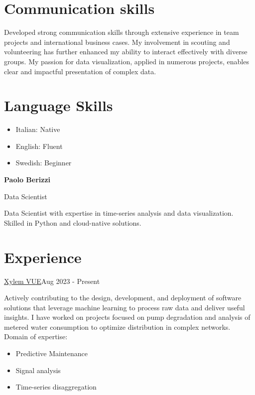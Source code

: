 \documentclass[hipsterpaolo]{simplehipstercv}
\begin{document}
\begin{paracol}{2}
{\section*{Communication skills}
Developed strong communication skills through extensive experience in team
projects and international business cases.
My involvement in scouting and volunteering has further enhanced my
ability to interact effectively with diverse groups. My passion for data visualization,
applied in numerous projects, enables clear and impactful presentation of complex data.

\section*{Language Skills}
\begin{itemize}[leftmargin=*]
    \item Italian: Native
    \item English: Fluent
    \item Swedish: Beginner
\end{itemize}

\phantom{turn the page}

\phantom{turn the page}

}
\switchcolumn
{\huge \color{myblue}\textbf{Paolo Berizzi}}

\bigskip

{\large Data Scientist}

{
\setfontcolour
\bigskip
Data Scientist with expertise in time-series analysis and data visualization.
\\
Skilled in Python and cloud-native solutions.

\section*{Experience}
{\underline{\href{https://www.xylem.com/en-us/brand/vue/}{Xylem VUE}}}{Aug 2023 - Present}
{
    Actively contributing to the design, development, and deployment of software solutions that leverage machine learning to process raw data and deliver useful insights.
    I have worked on projects focused on pump degradation and analysis of metered water consumption to optimize distribution in complex networks.\\
    Domain of expertise:
    \begin{itemize}[leftmargin=*]
        \item Predictive Maintenance
        \item Signal analysis
        \item Time-series disaggregation
    \end{itemize}
}

}
\end{paracol}
\end{document}
